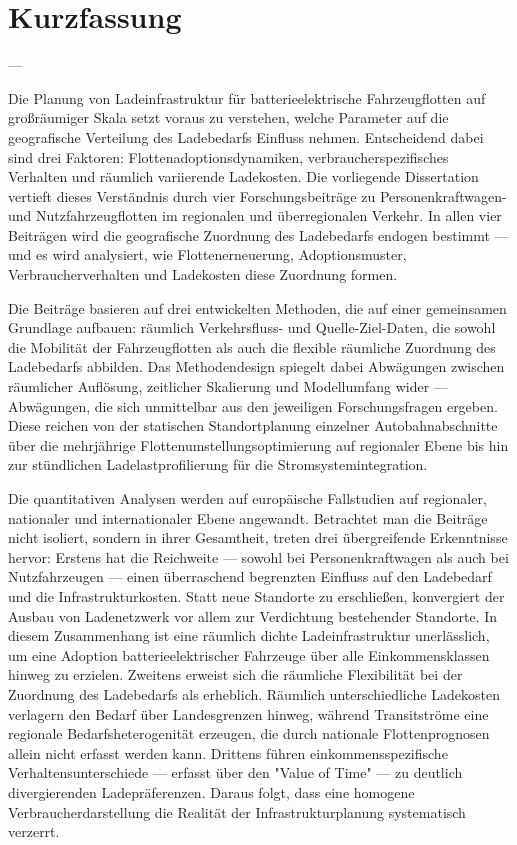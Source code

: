 \chapter*{Kurzfassung}
---

Die Planung von Ladeinfrastruktur für batterieelektrische Fahrzeugflotten auf großräumiger Skala setzt voraus zu verstehen, welche Parameter auf die geografische Verteilung des Ladebedarfs Einfluss nehmen. Entscheidend dabei sind drei Faktoren: Flottenadoptionsdynamiken, verbraucherspezifisches Verhalten und räumlich variierende Ladekosten. Die vorliegende Dissertation vertieft dieses Verständnis durch vier Forschungsbeiträge zu Personenkraftwagen- und Nutzfahrzeugflotten im regionalen und überregionalen Verkehr. In allen vier Beiträgen wird die geografische Zuordnung des Ladebedarfs endogen bestimmt --- und es wird analysiert, wie Flottenerneuerung, Adoptionsmuster, Verbraucherverhalten und Ladekosten diese Zuordnung formen.

Die Beiträge basieren auf drei entwickelten Methoden, die auf einer gemeinsamen Grundlage aufbauen: räumlich Verkehrsfluss- und Quelle-Ziel-Daten, die sowohl die Mobilität der Fahrzeugflotten als auch die flexible räumliche Zuordnung des Ladebedarfs abbilden. Das Methodendesign spiegelt dabei Abwägungen zwischen räumlicher Auflösung, zeitlicher Skalierung und Modellumfang wider --- Abwägungen, die sich unmittelbar aus den jeweiligen Forschungsfragen ergeben. Diese reichen von der statischen Standortplanung einzelner Autobahnabschnitte über die mehrjährige Flottenumstellungsoptimierung auf regionaler Ebene bis hin zur stündlichen Ladelastprofilierung für die Stromsystemintegration.

Die quantitativen Analysen werden auf europäische Fallstudien auf regionaler, nationaler und internationaler Ebene angewandt. Betrachtet man die Beiträge nicht isoliert, sondern in ihrer Gesamtheit, treten drei übergreifende Erkenntnisse hervor: Erstens hat die Reichweite --- sowohl bei Personenkraftwagen als auch bei Nutzfahrzeugen --- einen überraschend begrenzten Einfluss auf den Ladebedarf und die Infrastrukturkosten. Statt neue Standorte zu erschließen, konvergiert der Ausbau von Ladenetzwerk vor allem zur Verdichtung bestehender Standorte. In diesem Zusammenhang ist eine räumlich dichte Ladeinfrastruktur unerlässlich, um eine Adoption batterieelektrischer Fahrzeuge über alle Einkommensklassen hinweg zu erzielen. Zweitens erweist sich die räumliche Flexibilität bei der Zuordnung des Ladebedarfs als erheblich. Räumlich unterschiedliche Ladekosten verlagern den Bedarf über Landesgrenzen hinweg, während Transitströme eine regionale Bedarfsheterogenität erzeugen, die durch nationale Flottenprognosen allein nicht erfasst werden kann. Drittens führen einkommensspezifische Verhaltensunterschiede --- erfasst über den "Value of Time" --- zu deutlich divergierenden Ladepräferenzen. Daraus folgt, dass eine homogene Verbraucherdarstellung die Realität der Infrastrukturplanung systematisch verzerrt.

